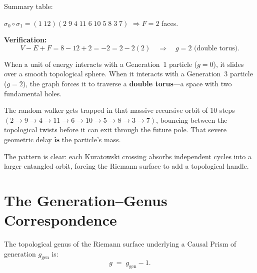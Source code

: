 \medskip
\noindent
Summary table:
\begin{center}
\renewcommand{\arraystretch}{1.15}
\end{center}
$\sigma_0 \circ \sigma_1 = (1\;12)(2\;9\;4\;11\;6\;10\;5\;8\;3\;7)$
\quad$\Longrightarrow$\quad $F = 2$ faces.

\medskip
\noindent
\textbf{Verification:}
\[
  V - E + F = 8 - 12 + 2 = -2 = 2 - 2(2)
  \quad\Longrightarrow\quad \boxed{g = 2} \text{ (double torus).}
\]

\begin{result}[title={The physics of the Top quark}]
When a unit of energy interacts with a Generation~1 particle
($g = 0$), it slides over a smooth topological sphere.
When it interacts with a Generation~3 particle ($g = 2$), the graph
forces it to traverse a \textbf{double torus}---a space with two
fundamental holes.

The random walker gets trapped in that massive recursive orbit of
10 steps $(2 \to 9 \to 4 \to 11 \to 6 \to 10 \to 5 \to 8 \to 3 \to 7)$,
bouncing between the topological twists before it can exit through the
future pole. That severe geometric delay \textbf{is} the particle's
mass.
\end{result}

\noindent
The pattern is clear: each Kuratowski crossing absorbs independent
cycles into a larger entangled orbit, forcing the Riemann surface
to add a topological handle.

\section{The Generation--Genus Correspondence}
\label{sec:gen-genero}

\begin{theorem}
\label{thm:gen-genero}
The topological genus of the Riemann surface underlying a Causal Prism
of generation $g_{\mathrm{gen}}$ is:
\[
  g \;=\; g_{\mathrm{gen}} - 1.
\]
\end{theorem}

